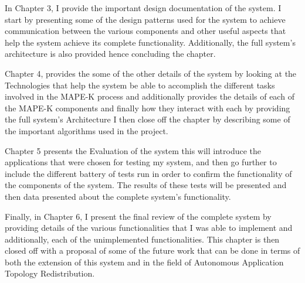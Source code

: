 In Chapter 3, I provide the important design documentation of the system. I start by presenting some of the design patterns used for the system to achieve communication between the various components and other useful aspects that help the system achieve its complete functionality. Additionally, the full system's architecture is also provided hence concluding the chapter.

Chapter 4, provides the some of the other details of the system by looking at the Technologies that help the system be able to accomplish the different tasks involved in the MAPE-K process and additionally provides the details of each of the MAPE-K components and finally how they interact with each by providing the full system's Architecture I then close off the chapter by describing some of the important algorithms used in the project.

Chapter 5 presents the Evaluation of the system this will introduce the applications that were chosen for testing my system, and then go further to include the different battery of tests run in order to confirm the functionality of the components of the system. The results of these tests will be presented and then data presented about the complete system's functionality.

Finally, in Chapter 6, I present the final review of the complete system by providing details of the various functionalities that I was able to implement and additionally, each of the unimplemented functionalities. This chapter is then closed off with a proposal of some of the future work that can be done in terms of both the extension of this system and in the field of Autonomous Application Topology Redistribution.





